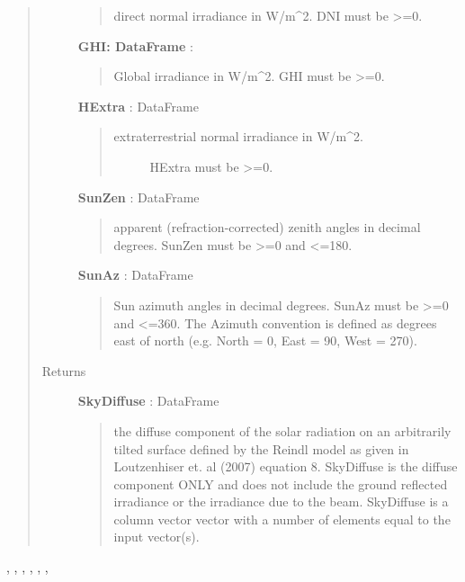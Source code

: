 \documentclass[letterpaper,10pt,english]{sphinxmanual}
\begin{document}
\begin{fulllineitems}
\begin{quote}
\begin{description}
\begin{quote}
direct normal irradiance in W/m\textasciicircum{}2. 
DNI must be \textgreater{}=0.
\end{quote}

\textbf{GHI: DataFrame} :
\begin{quote}

Global irradiance in W/m\textasciicircum{}2. 
GHI must be \textgreater{}=0.
\end{quote}

\textbf{HExtra} : DataFrame
\begin{quote}
\begin{description}
\item[{extraterrestrial normal irradiance in W/m\textasciicircum{}2. }] \leavevmode
HExtra must be \textgreater{}=0.

\end{description}
\end{quote}

\textbf{SunZen} : DataFrame
\begin{quote}

apparent (refraction-corrected) zenith
angles in decimal degrees. 
SunZen must be \textgreater{}=0 and \textless{}=180.
\end{quote}

\textbf{SunAz} : DataFrame
\begin{quote}

Sun azimuth angles in decimal degrees.
SunAz must be \textgreater{}=0 and \textless{}=360. The Azimuth convention is defined
as degrees east of north (e.g. North = 0, East = 90, West = 270).
\end{quote}

\item[{Returns}] \leavevmode
\textbf{SkyDiffuse} : DataFrame
\begin{quote}

the diffuse component of the solar radiation  on an
arbitrarily tilted surface defined by the Reindl model as given in
Loutzenhiser et. al (2007) equation 8.
SkyDiffuse is the diffuse component ONLY and does not include the ground
reflected irradiance or the irradiance due to the beam.
SkyDiffuse is a column vector vector with a number of elements equal to
the input vector(s).
\end{quote}

\end{description}\end{quote}




{\hyperref[stubs/pvlib.pvl_ephemeris:pvlib.pvl_ephemeris]{}}, {\hyperref[stubs/pvlib.pvl_extraradiation:pvlib.pvl_extraradiation]{}}, {\hyperref[stubs/pvlib.pvl_isotropicsky:pvlib.pvl_isotropicsky]{}}, {\hyperref[stubs/pvlib.pvl_haydavies1980:pvlib.pvl_haydavies1980]{}}, {\hyperref[stubs/pvlib.pvl_perez:pvlib.pvl_perez]{}}, {\hyperref[stubs/pvlib.pvl_klucher1979:pvlib.pvl_klucher1979]{}}, {\hyperref[stubs/pvlib.pvl_kingdiffuse:pvlib.pvl_kingdiffuse]{}}



\end{fulllineitems}
\end{document}
